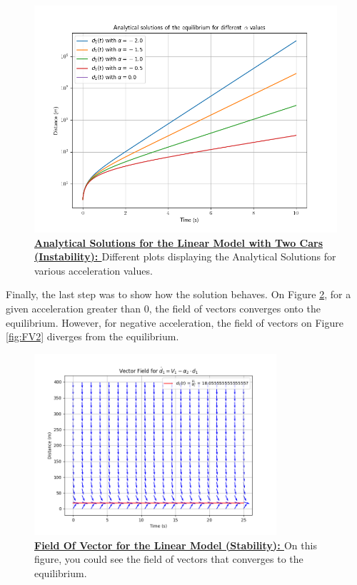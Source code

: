 \documentclass{article}
\begin{document}
		\begin{figure}[H]
			\centering
			\includegraphics[width=0.8\linewidth]{Unstability.png}
			\caption[Analytical Solutions for the Linear Model with Two Cars]{\textbf{\underline{Analytical Solutions for the Linear Model with Two Cars (Instability): }}Different plots displaying the Analytical Solutions for various acceleration values.}
			\label{fig:AS2}
		\end{figure}
		
		Finally, the last step was to show how the solution behaves. On Figure \ref{fig:FV1}, for a given acceleration greater than 0, the field of vectors converges onto the equilibrium. However, for negative acceleration, the field of vectors on Figure \ref{fig:FV2} diverges from the equilibrium.
		
		\begin{figure}[H]
			\centering
			\includegraphics[width=0.8\textwidth]{FieldOfVector_CV.png}
			\caption{\textbf{\underline{Field Of Vector for the Linear Model (Stability): }} On this figure, you could see the field of vectors that converges to the equilibrium.}
			\label{fig:FV1}
		\end{figure}
		
\end{document}
